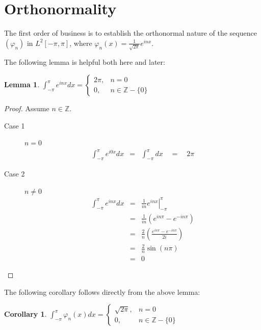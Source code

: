 \documentclass[letterpaper,12pt,fleqn,reqno]{amsart}
\theoremstyle{plain}
\newtheorem{lemma}[theorem]{Lemma}
\newtheorem{corollary}[theorem]{Corollary}
\newcommand{\Z}{\mathbb{Z}}
\newcommand{\vp}{\varphi}
\newcommand{\Ltp}{L^2[-\pi,\pi]}
\begin{document}
\section{Orthonormality}

The first order of business is to establish the orthonormal nature of the
sequence $(\vp_n)$ in $\Ltp$, where $\vp_n(x)=\frac{1}{\sqrt{2\pi}}e^{inx}$.

The following lemma is helpful both here and later:

\begin{lemma}
  \label{lem:e}
  $\int_{-\pi}^{\pi}e^{inx}dx=\begin{cases}
  2\pi, & n=0 \\
  0, & n\in\Z-\{0\}
  \end{cases}$
\end{lemma}

\begin{proof}
  Assume $n\in\Z$.

  \begin{description}
  \item[Case 1] $n=0$
    \begin{eqnarray*}
      \int_{-\pi}^{\pi}e^{i0x}dx &=& \int_{-\pi}^{\pi}dx\quad=\quad2\pi
    \end{eqnarray*}

  \item[Case 2] $n\ne0$
    \begin{eqnarray*}
      \int_{-\pi}^{\pi}e^{inx}dx &=&
      \left.\frac{1}{in}e^{inx}\right|_{-\pi}^{\pi} \\
      &=& \frac{1}{in}(e^{in\pi}-e^{-in\pi}) \\
      &=& \frac{2}{n}\left(\frac{e^{in\pi}-e^{-in\pi}}{2i}\right) \\
      &=& \frac{2}{n}\sin(n\pi) \\
      &=& 0
    \end{eqnarray*}
  \end{description}
\end{proof}

The following corollary follows directly from the above lemma:

\begin{corollary}
  $\int_{-\pi}^{\pi}\vp_n(x)dx=\begin{cases}
  \sqrt{2\pi}, & n=0 \\
  0, & n\in\Z-\{0\}
  \end{cases}$
\end{corollary}
\end{document}

